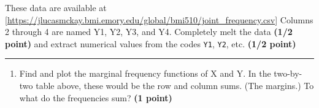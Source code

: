 \documentclass[
]{article}
\newenvironment{Shaded}{\begin{snugshade}}{\end{snugshade}}
\newcommand{\AttributeTok}[1]{\textcolor[rgb]{0.77,0.63,0.00}{#1}}
\newcommand{\DocumentationTok}[1]{\textcolor[rgb]{0.56,0.35,0.01}{\textbf{\textit{#1}}}}
\newcommand{\FunctionTok}[1]{\textcolor[rgb]{0.00,0.00,0.00}{#1}}
\newcommand{\NormalTok}[1]{#1}
\newcommand{\OtherTok}[1]{\textcolor[rgb]{0.56,0.35,0.01}{#1}}
\newcommand{\SpecialCharTok}[1]{\textcolor[rgb]{0.00,0.00,0.00}{#1}}
\newcommand{\StringTok}[1]{\textcolor[rgb]{0.31,0.60,0.02}{#1}}
\providecommand{\tightlist}{%
  \setlength{\itemsep}{0pt}\setlength{\parskip}{0pt}}
\begin{document}
These data are available at
{[}\url{https://jlucasmckay.bmi.emory.edu/global/bmi510/joint_frequency.csv}{]}
Columns 2 through 4 are named Y1, Y2, Y3, and Y4. Completely melt the
data \textbf{(1/2 point)} and extract numerical values from the codes
\texttt{Y1}, \texttt{Y2}, etc. \textbf{(1/2 point)}

\begin{Shaded}
\end{Shaded}

\begin{center}\rule{0.5\linewidth}{0.5pt}\end{center}

\begin{enumerate}
\def\labelenumi{\arabic{enumi}.}
\setcounter{enumi}{9}
\tightlist
\item
  Find and plot the marginal frequency functions of X and Y. In the
  two-by-two table above, these would be the row and column sums. (The
  margins.) To what do the frequencies sum? \textbf{(1 point)}
\end{enumerate}
\end{document}
